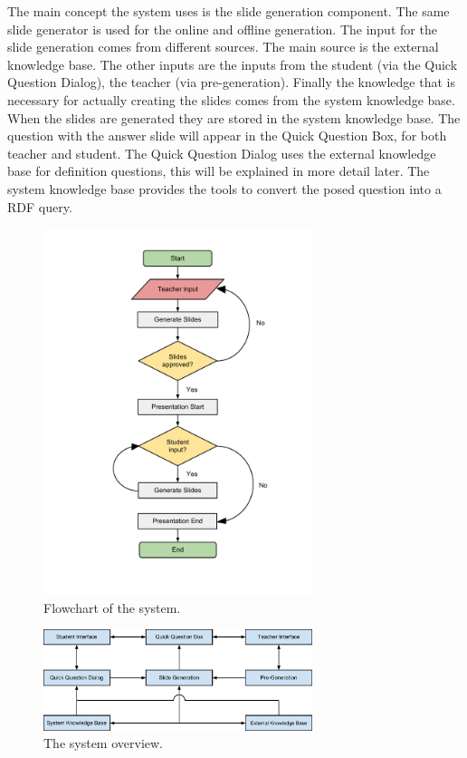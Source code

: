 \documentclass[11pt]{article}
\begin{document}
The main concept the system uses is the slide generation component. The same slide generator is used for the online and offline generation. The input for the slide generation comes from different sources. The main source is the external knowledge base. The other inputs are the inputs from the student (via the Quick Question Dialog), the teacher (via pre-generation). Finally the knowledge that is necessary for actually creating the slides comes from the system knowledge base.
When the slides are generated they are stored in the system knowledge base. The question with the answer slide will appear in the Quick Question Box, for both teacher and student.
The Quick Question Dialog uses the external knowledge base for definition questions, this will be explained in more detail later. The system knowledge base provides the tools to convert the posed question into a RDF query.

\begin{figure}[!h]
\centering
\includegraphics[width=0.7\textwidth]{KBMSFlowchartnew.pdf}
\caption{Flowchart of the system.}
\label{flowchart}
\end{figure}

\begin{figure}[!h]
\centering
\includegraphics[width=0.7\textwidth]{systemOverview.pdf}
\caption{The system overview.}
\label{systemOverview}
\end{figure}
\end{document}
